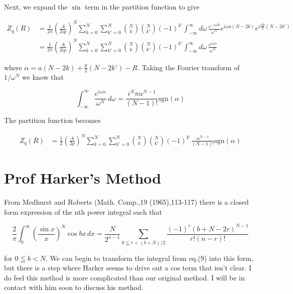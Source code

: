 \documentclass[a4paper,12pt,titlepage]{report}
\begin{document}
Next, we expand the $\sin$ term in the partition function to give

\begin{align}
Z_{q}\left(R\right) &= \frac{1}{2 \pi} \left(\frac{A}{2ip}\right)^{N}\sum^{N}_{k=0}\sum^{N}_{k'=0}\binom{N}{k}\binom{N}{k'}(-1)^{k'}\int_{-\infty}^{\infty}d\omega\, \frac{e^{-i\omega R}}{\omega^{N}} e^{i\omega a(N-2k)}e^{i\frac{\omega p}{2}(N-2k')}\\
&= \frac{1}{2 \pi} \left(\frac{A}{2ip}\right)^{N}\sum^{N}_{k=0}\sum^{N}_{k'=0}\binom{N}{k}\binom{N}{k'}(-1)^{k'}\int_{-\infty}^{\infty}d\omega\, \frac{e^{i\omega \alpha}}{\omega^{N}} 
\end{align}

where $\alpha = a(N-2k) + \frac{p}{2}(N-2k') - R$. Taking the Fourier transform of $1/\omega^{N}$ we know that 

\begin{equation}
\int_{-\infty}^{\infty}\frac{e^{i \omega \alpha}}{\omega^{N}}\,d\omega = \frac{i^{N} \pi \alpha^{N-1}}{\left(N-1\right)!}\text{sgn}\left(\alpha\right)
\end{equation}

The partition function becomes

\begin{align}
Z_{q}\left(R\right) &= \frac{1}{2}\left(\frac{A}{2p}\right)^{N}\sum^{N}_{k=0}\sum^{N}_{k'=0}\binom{N}{k}\binom{N}{k'}(-1)^{k'}\frac{\alpha^{N-1}}{\left(N-1\right)!}\text{sgn}\left(\alpha\right)
\end{align}

\section*{Prof Harker's Method}

From Medhurst and Roberts (Math. Comp.,19 (1965),113-117) there is a closed form expression of the nth power integral such that

\begin{equation}
\frac{2}{\pi}\int_{0}^{\infty}\left(\frac{\sin x}{x}\right)^{N}\cos bx \,dx = \frac{N}{2^{n-1}}\sum_{0 \leqq r < \left(b+N\right)/2} \frac{\left(-1\right)^{r}\left( b+N-2r \right)^{N-1}}{r!\left(n-r\right)!}
\end{equation}

for $0 \leqq b < N$. We can begin to transform the integral from eq.(9) into this form, but there is a step where Harker seems to drive out a cos term that isn't clear. I do feel this method is more complicated than our original method. I will be in contact with him soon to discuss his method.
\end{document}

